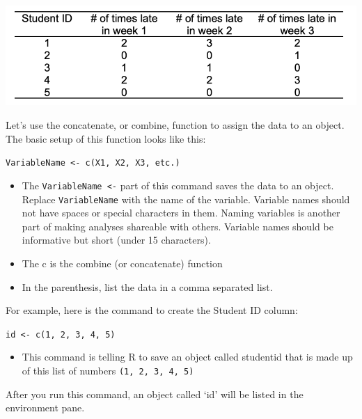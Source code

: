 \documentclass[
]{book}
\providecommand{\tightlist}{%
  \setlength{\itemsep}{0pt}\setlength{\parskip}{0pt}}
\begin{document}
\includegraphics{img/data.png}

Let's use the concatenate, or combine, function to assign the data to an object. The basic setup of this function looks like this:

\texttt{VariableName\ \textless{}-\ c(X1,\ X2,\ X3,\ etc.)}

\begin{itemize}
\tightlist
\item
  The \texttt{VariableName\ \textless{}-} part of this command saves the data to an object. Replace \texttt{VariableName} with the name of the variable. Variable names should not have spaces or special characters in them. Naming variables is another part of making analyses shareable with others. Variable names should be informative but short (under 15 characters).\\
\item
  The c is the combine (or concatenate) function\\
\item
  In the parenthesis, list the data in a comma separated list.
\end{itemize}

For example, here is the command to create the Student ID column:

\texttt{id\ \textless{}-\ c(1,\ 2,\ 3,\ 4,\ 5)}

\begin{itemize}
\tightlist
\item
  This command is telling R to save an object called studentid that is made up of this list of numbers \texttt{(1,\ 2,\ 3,\ 4,\ 5)}
\end{itemize}

After you run this command, an object called `id' will be listed in the environment pane.
\end{document}

